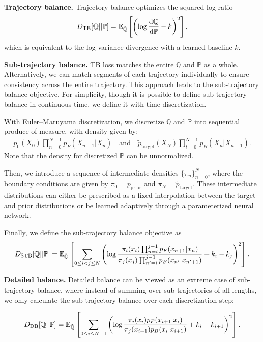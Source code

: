 \documentclass{article} %
\def\ptilde{\tilde{p}_\text{target}}
\begin{document}
\textbf{Trajectory balance.} Trajectory balance optimizes the squared log ratio
\begin{align}
    D_\mathrm{TB}[\mathbb{Q}||\mathbb{P}] = \mathbb{E}_{\tilde{\mathbb{Q}}} \left[
  \left(\log   \frac{\mathrm{d} \mathbb{Q}}{\mathrm{d} \mathbb{P}} - k\right)^2
    \right],
\end{align}
which is equivalent to the log-variance divergence with a learned baseline $k$.

\textbf{Sub-trajectory balance.} 
TB loss matches the entire $\mathbb{Q}$ and $\mathbb{P}$ as a whole. 
Alternatively, we can match segments of each trajectory individually to ensure consistency across the entire trajectory. This approach leads to the sub-trajectory balance objective. 
For simplicity, though it is possible to define sub-trajectory balance in continuous time, we define it with time discretization.
\par
With Euler–Maruyama discretization, we discretize $\mathbb{Q}$ and $\mathbb{P}$ into sequential produce of measure, with density given by:
\begin{align}
 p_0(X_0) \prod_{n=0}^{N-1} p_F(X_{n+1}|X_n) \quad\text{and}\quad   \ptilde(X_N) \prod_{t=0}^{N-1} p_B(X_n|X_{n+1}).
\end{align}
Note that the density for discretized $\mathbb{P}$ can be unnormalized.


Then, we introduce a sequence of intermediate densities \(\{\pi_n\}_{n=0}^{N}\), where the boundary conditions are given by \(\pi_0 = p_{\text{prior}}\) and \(\pi_N = \tilde{p}_{\text{target}}\). 
These intermediate distributions can either be prescribed as a fixed interpolation between the target and prior distributions or be learned adaptively through a parameterized neural network.

Finally, we define the sub-trajectory balance objective as
\begin{align}
      D_\mathrm{STB}[\mathbb{Q}||\mathbb{P}] = \mathbb{E}_{\tilde{\mathbb{Q}}} \left[ \sum_{0 \leq i<j\leq N}
  \left(\log   \frac{\pi_i(x_i) \prod_{n=i}^{j-1} p_F(x_{n+1}|x_n) }{\pi_j(x_j) \prod_{n'=i}^{j-1} p_B(x_{n'}|x_{n'+1})} + k_i - k_j\right)^2
    \right].
\end{align}

\textbf{Detailed balance.} 
Detailed balance can be viewed as an extreme case of sub-trajectory balance, where instead of summing over sub-trajectories of all lengths, we only calculate the sub-trajectory balance over each discretization step:

\begin{align}
      D_\mathrm{DB}[\mathbb{Q}||\mathbb{P}] = \mathbb{E}_{\tilde{\mathbb{Q}}} \left[ \sum_{0 \leq i\leq N-1}
  \left(\log   \frac{\pi_i(x_i) p_F(x_{i+1}|x_i) }{\pi_j(x_{i+1})  p_B(x_{i}|x_{i+1})} + k_i - k_{i+1}\right)^2
    \right].
\end{align}
\end{document}
